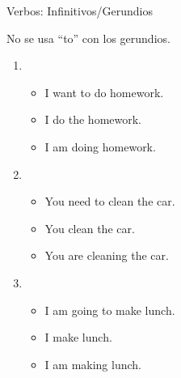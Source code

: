 \begin{conf}{Verbos: Infinitivos/Gerundios}

No se usa ``to'' con los gerundios.
\begin{enumerate}
	\item {}
		\begin{itemize}
			\item {} \arr I want to do homework.
			\item {} \arr I do the homework.
			\item {} \arr I am doing homework.
		\end{itemize}
	\item {}
		\begin{itemize}
			\item {} \arr You need to clean the car.
			\item {} \arr You clean the car.
			\item {} \arr You are cleaning the car.
		\end{itemize}
	\item {}
		\begin{itemize}
			\item {} \arr I am going to make lunch.
			\item {} \arr I make lunch.
			\item {} \arr I am making lunch.
		\end{itemize}
\end{enumerate}

\end{conf}

